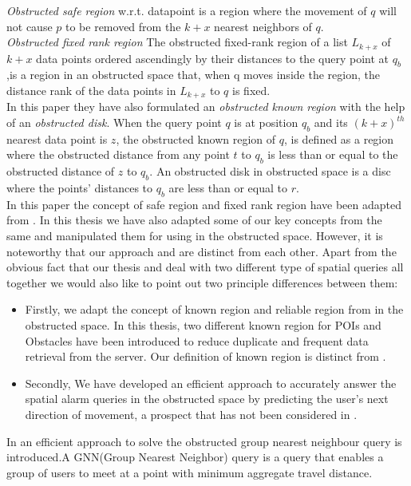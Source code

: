 \textit{Obstructed safe region} w.r.t. datapoint is  a region where the movement of $q$ will not cause $p$ to be removed from the $k + x$ nearest neighbors of $q$.\\
\textit{Obstructed fixed rank region}  The obstructed fixed-rank region of a list
$L_{k+x}$ of $k + x$ data points ordered ascendingly by their distances to the query point at $q_b$,is a region in an obstructed space that, when q moves inside the region, the distance rank of the data points in $L_{k+x}$ to $q$ is fixed.\\

In this paper they have also formulated an \textit{obstructed known region} with the help of an \textit{obstructed disk}. When the query point $q$ is at position $q_{b}$ and its $(k+x)^{th}$ nearest data point is $z$, the obstructed known region of $q$, is defined as a region where the obstructed distance from any point $t$ to $q_b$ is less than or equal to the obstructed distance of $z$ to $q_{b}$. An obstructed disk in obstructed space is a disc where the points’ distances to $q_b$ are less than or equal to $r$. \\

In this paper the concept of safe region and fixed rank region have been adapted from \cite{mknn}. In this thesis we have also adapted some of our key concepts from the same and manipulated them for using in the obstructed space. However, it is noteworthy that our approach and \cite{oknn} are distinct from each other. Apart from the obvious fact that our thesis and \cite{oknn} deal with two different type of spatial queries all together we would also like to point out two principle differences between them:
\begin{itemize}
\item Firstly, we adapt the concept of known region and reliable region from \cite{mknn} in the obstructed space. In this thesis, two different known region for POIs and Obstacles have been introduced to reduce duplicate and frequent data retrieval from the server. Our definition of known region is distinct from \cite{oknn}.
\item Secondly, We have developed an efficient approach to accurately answer the spatial alarm queries in the obstructed space by predicting the user's next direction of movement, a prospect that has not been considered in \cite{oknn}.  
\end{itemize}

In \cite{ognn} an efficient approach to solve the obstructed group nearest neighbour query is introduced.A GNN(Group Nearest Neighbor) query is a query that enables a group of users to meet at a point with minimum aggregate travel distance. \\  
  
